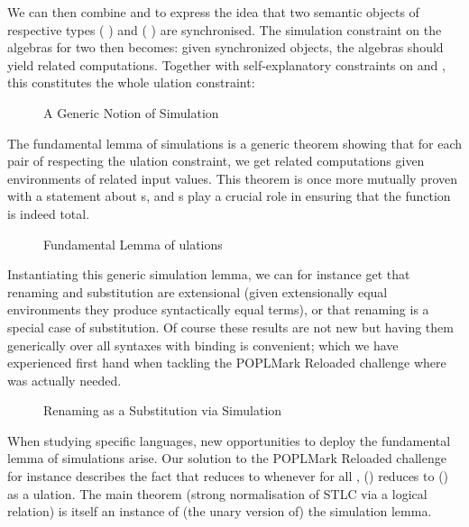 We can then combine  and  to express the idea
that two semantic objects of respective types
   (  ) and
   (  ) are
synchronised. The simulation constraint on the algebras for two \semrec{}
then becomes: given synchronized objects, the algebras should yield
related computations. Together with self-explanatory constraints on
 and , this constitutes the whole ulation
constraint:

\begin{figure}[h]
\caption{A Generic Notion of Simulation}
\end{figure}

The fundamental lemma of simulations is a generic theorem showing that for
each pair of \semrec{} respecting the ulation constraint, we
get related computations given environments of related input values. This
theorem is once more mutually proven with a statement about s,
and s play a crucial role in ensuring that the function is indeed total.

\begin{figure}[h]
\caption{Fundamental Lemma of ulations}
\end{figure}

Instantiating this generic simulation lemma, we can for instance get
that renaming and substitution are extensional (given extensionally
equal environments they produce syntactically equal terms), or that
renaming is a special case of substitution. Of course these results
are not new but having them generically over all syntaxes with binding
is convenient; which we have experienced first hand when tackling the
POPLMark Reloaded challenge where  was actually needed.

\begin{figure}[h]
\caption{Renaming as a Substitution via Simulation}
\end{figure}

When studying specific languages, new opportunities to deploy the
fundamental lemma of simulations arise. Our solution to the POPLMark
Reloaded challenge for instance describes the fact that { \AB{$\rho$} }
reduces to {  } whenever for all ,
\AB{$\rho$}() reduces to () as a ulation.
The main theorem (strong normalisation of STLC via a logical relation)
is itself an instance of (the unary version of) the simulation lemma.

